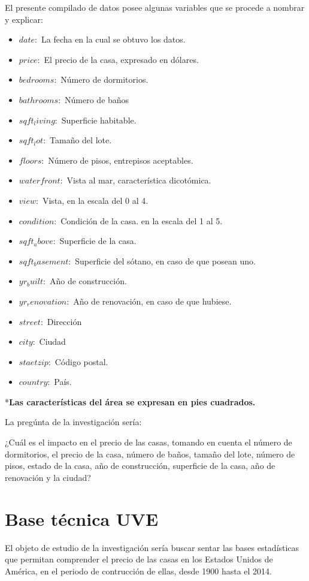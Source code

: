 \documentclass[
  oneside]{memoir}
\begin{document}
El presente compilado de datos posee algunas variables que se procede a
nombrar y explicar:

\begin{itemize}
\item $date:$ La fecha en la cual se obtuvo los datos.
\item $price:$ El precio de la casa, expresado en dólares.
\item $bedrooms:$ Número de dormitorios.
\item $bathrooms:$ Número de baños
\item $sqft_living:$ Superficie habitable.
\item $sqft_lot:$ Tamaño del lote.
\item $floors:$ Número de pisos, entrepisos aceptables.
\item $waterfront:$ Vista al mar, característica dicotómica.
\item $view:$ Vista, en la escala del 0 al 4.
\item $condition:$ Condición de la casa. en la escala del 1 al 5.
\item $sqft_above:$ Superficie de la casa.
\item $sqft_basement:$ Superficie del sótano, en caso de que posean uno.
\item $yr_built:$ Año de construcción.
\item $yr_renovation:$ Año de renovación, en caso de que hubiese.
\item $street:$ Dirección 
\item $city:$ Ciudad 
\item $staetzip:$ Código postal.
\item $country:$ País.
\end{itemize}

*\textbf{Las características del área se expresan en pies cuadrados.}

La pregúnta de la investigación sería:

¿Cuál es el impacto en el precio de las casas, tomando en cuenta el
número de dormitorios, el precio de la casa, número de baños, tamaño del
lote, número de pisos, estado de la casa, año de construcción,
superficie de la casa, año de renovación y la ciudad?

\section{Base técnica UVE}

El objeto de estudio de la investigación sería buscar sentar las bases
estadísticas que permitan comprender el precio de las casas en los
Estados Unidos de América, en el periodo de contrucción de ellas, desde
1900 hasta el 2014.
\end{document}
